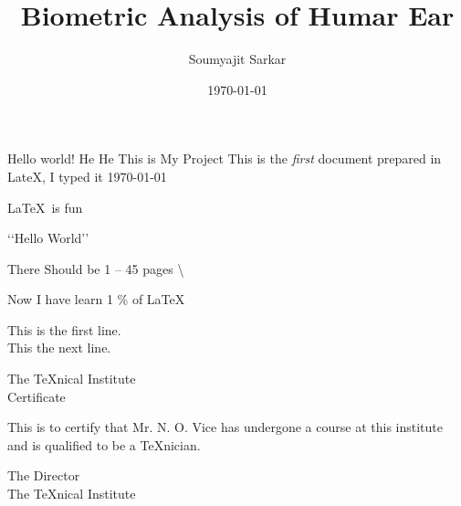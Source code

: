 \documentclass{article}
\title{Biometric Analysis of Humar Ear}
\author{Soumyajit Sarkar}
\date{\today}
\begin{document}
   \maketitle
   Hello world! He He This is My Project
   This is the \emph{first} document prepared in LateX, I typed it \today
   
   \LaTeX \ is fun
   
   \lq\lq Hello World\rq\rq
   
   There Should be 1 -- 45 pages \textbackslash
   
   Now  I have learn 1 \% of \LaTeX
   
   This is the first line. \\ [10pt]
     \@ \@ \@  This the next line.
     \\
     
     \pagebreak
     \begin{center}
    The \TeX nical Institute\\[.75cm]
      Certificate
  \end{center}
  \noindent This is to certify that Mr. N. O. Vice has undergone a
  course at this institute and is qualified to be a \TeX nician.
  \begin{flushright}
    The Director\\
    The \TeX nical Institute
  \end{flushright}
\end{document}
